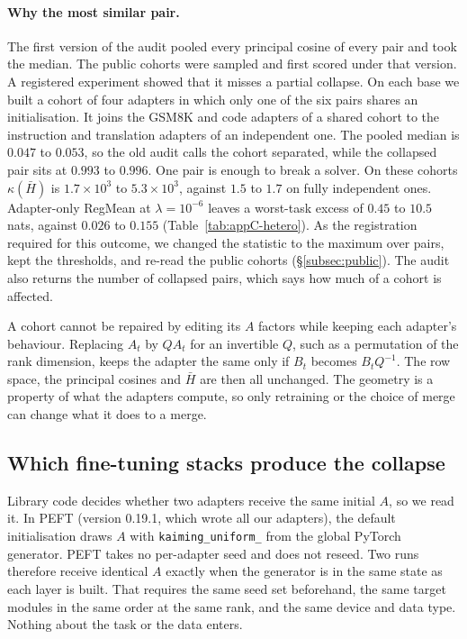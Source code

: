 \paragraph{Why the most similar pair.} The first version of the audit pooled
every principal cosine of every pair and took the median. The public cohorts
were sampled and first scored under that version. A registered experiment
showed that it misses a partial collapse. On each base we built a cohort of
four adapters in which only one of the six pairs shares an initialisation. It
joins the GSM8K and code adapters of a shared cohort to the instruction and
translation adapters of an independent one. The pooled median is $0.047$ to
$0.053$, so the old audit calls the cohort separated, while the collapsed pair
sits at $0.993$ to $0.996$. One pair is enough to break a solver. On these
cohorts $\kappa(\bar H)$ is $1.7\times10^{3}$ to $5.3\times10^{3}$, against
$1.5$ to $1.7$ on fully independent ones. Adapter-only RegMean at
$\lambda = 10^{-6}$ leaves a worst-task excess of $0.45$ to $10.5$ nats,
against $0.026$ to $0.155$ (Table~\ref{tab:appC-hetero}). As the
registration required for this outcome, we changed the statistic to the
maximum over pairs, kept the thresholds, and re-read the public cohorts
(\S\ref{subsec:public}). The audit also returns the number of collapsed
pairs, which says how much of a cohort is affected.

A cohort cannot be repaired by editing its $A$ factors while keeping each
adapter's behaviour. Replacing $A_t$ by $QA_t$ for an invertible $Q$, such as a permutation of the
rank dimension, keeps the
adapter the same only if $B_t$ becomes $B_tQ^{-1}$. The row space, the
principal cosines and $\bar H$ are then all unchanged. The geometry is a
property of what the adapters compute, so only retraining or the choice of
merge can change what it does to a merge.

\subsection{Which fine-tuning stacks produce the collapse}\label{subsec:libraries}

Library code decides whether two adapters receive the same initial $A$, so we
read it. In PEFT (version 0.19.1, which wrote all our adapters), the default
initialisation draws $A$ with \texttt{kaiming\_uniform\_} from the global
PyTorch generator. PEFT takes no per-adapter seed and does not reseed. Two runs
therefore receive identical $A$ exactly when the generator is in the same
state as each layer is built. That requires the same seed set beforehand, the
same target modules in the same order at the same rank, and the same device
and data type. Nothing about the task or the data enters.

